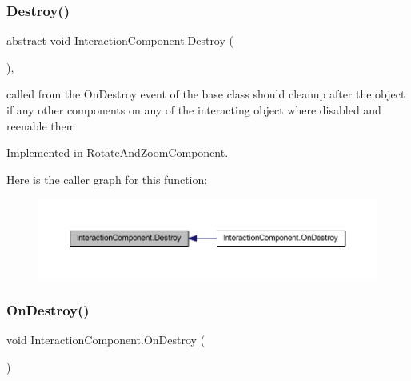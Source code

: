 \subsubsection{\texorpdfstring{Destroy()}{Destroy()}}
{\footnotesize\ttfamily abstract void Interaction\+Component.\+Destroy (\begin{DoxyParamCaption}{ }\end{DoxyParamCaption})\hspace{0.3cm}{\ttfamily [protected]}, {}}



called from the On\+Destroy event of the base class should cleanup after the object if any other components on any of the interacting object where disabled and reenable them 



Implemented in \mbox{\hyperlink{class_rotate_and_zoom_component_aa116a1acdc75d587605b6fa043474982}{Rotate\+And\+Zoom\+Component}}.

Here is the caller graph for this function\+:
\nopagebreak
\begin{figure}[H]
\begin{center}
\leavevmode
\includegraphics[width=350pt]{class_interaction_component_aa28f5c9f92b342c3d52f8b0b251fb4fa_icgraph}
\end{center}
\end{figure}
\mbox{\label{class_interaction_component_a3add77b0cb9df6b962ea2c66d317fa46}} 
\subsubsection{\texorpdfstring{On\+Destroy()}{OnDestroy()}}
{\footnotesize\ttfamily void Interaction\+Component.\+On\+Destroy (\begin{DoxyParamCaption}{ }\end{DoxyParamCaption})\hspace{0.3cm}{\ttfamily [private]}}

